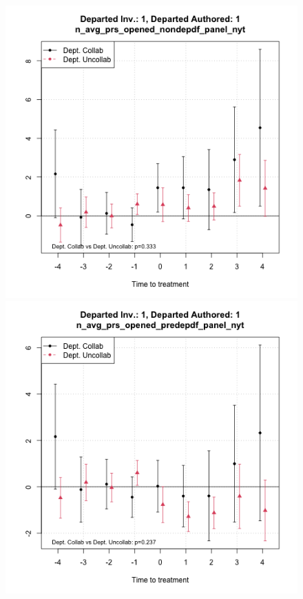 \begin{figure}[htbp]
\begin{minipage}[b]{0.49\textwidth}
    \end{minipage}
    \hfill
    \begin{minipage}[b]{0.49\textwidth}
        \centering
        \includegraphics[width=\textwidth]{temp/output/collab_imp/auth_n1_inv_n1_cs_norm_n_avg_prs_opened_nondep.png}
    \end{minipage}
    \hfill
    \begin{minipage}[b]{0.49\textwidth}
        \centering
        \includegraphics[width=\textwidth]{temp/output/collab_imp/auth_n1_inv_n1_cs_norm_n_avg_prs_opened_predep.png}

\end{minipage}
\end{figure}
